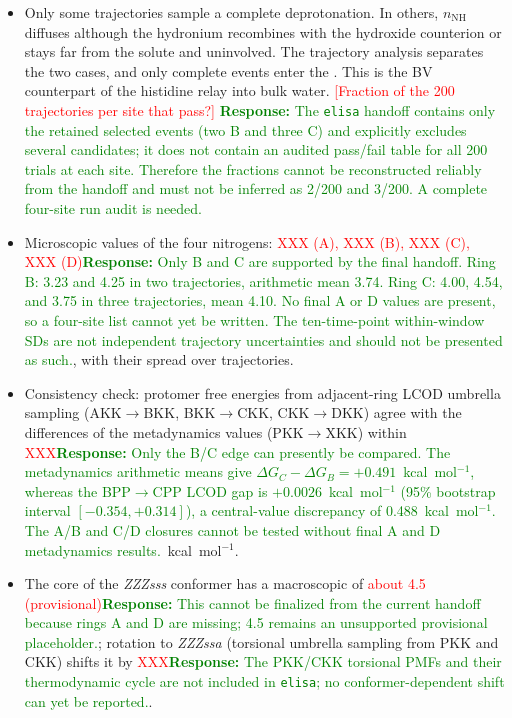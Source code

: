 \begin{itemize}
\item Only some trajectories sample a complete deprotonation. In others, $n_{\mathrm{NH}}$ diffuses although the hydronium recombines with the hydroxide counterion or stays far from the solute and uninvolved. The trajectory analysis separates the two cases, and only complete events enter the \pka{}. This is the BV counterpart of the histidine relay into bulk water. \textcolor{red}{[Fraction of the 200 trajectories per site that pass?]}
\textcolor{green}{\textbf{Response:} The \texttt{elisa} handoff contains only the retained selected events (two B and three C) and explicitly excludes several candidates; it does not contain an audited pass/fail table for all 200 trials at each site. Therefore the fractions cannot be reconstructed reliably from the handoff and must not be inferred as 2/200 and 3/200. A complete four-site run audit is needed.}
\item Microscopic \pka{} values of the four nitrogens: \textcolor{red}{XXX (A), XXX (B), XXX (C), XXX (D)}\textcolor{green}{\textbf{Response:} Only B and C are supported by the final handoff. Ring B: 3.23 and 4.25 in two trajectories, arithmetic mean 3.74. Ring C: 4.00, 4.54, and 3.75 in three trajectories, mean 4.10. No final A or D values are present, so a four-site list cannot yet be written. The ten-time-point within-window SDs are not independent trajectory uncertainties and should not be presented as such.}, with their spread over trajectories.
\item Consistency check: protomer free energies from adjacent-ring LCOD umbrella sampling (AKK$\rightarrow$BKK, BKK$\rightarrow$CKK, CKK$\rightarrow$DKK) agree with the differences of the metadynamics values (PKK$\rightarrow$XKK) within \textcolor{red}{XXX}\textcolor{green}{\textbf{Response:} Only the B/C edge can presently be compared. The metadynamics arithmetic means give $\Delta G_C-\Delta G_B=+0.491$~kcal~mol$^{-1}$, whereas the BPP$\rightarrow$CPP LCOD gap is $+0.0026$~kcal~mol$^{-1}$ (95\% bootstrap interval $[-0.354,+0.314]$), a central-value discrepancy of 0.488~kcal~mol$^{-1}$. The A/B and C/D closures cannot be tested without final A and D metadynamics results.}~kcal~mol$^{-1}$.
\item The core of the \textit{ZZZsss} conformer has a macroscopic \pka{} of \textcolor{red}{about 4.5 (provisional)}\textcolor{green}{\textbf{Response:} This cannot be finalized from the current handoff because rings A and D are missing; 4.5 remains an unsupported provisional placeholder.}; rotation to \textit{ZZZssa} (torsional umbrella sampling from PKK and CKK) shifts it by \textcolor{red}{XXX}\textcolor{green}{\textbf{Response:} The PKK/CKK torsional PMFs and their thermodynamic cycle are not included in \texttt{elisa}; no conformer-dependent \pka{} shift can yet be reported.}.
\end{itemize}

